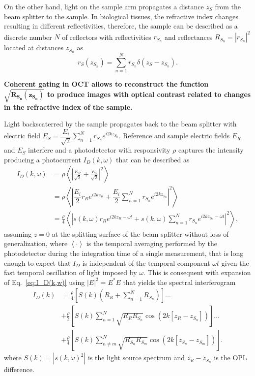 On the other hand, light on the sample arm propagates a distance $z_S$ from the beam splitter to the sample. In biological tissues, the refractive index changes resulting in different reflectivities, therefore, the sample can be described as a discrete number $N$ of reflectors with reflectivities $r_{S_n}$ and reflectances $R_{S_n}=|r_{S_n}|^2$ located at distances $z_{S_n}$ as
\begin{equation}
    r_S(z_{S_n}) = \sum_{n=1}^N r_{S_n}\delta\left(z_S-z_{S_n}\right).
\end{equation}

\textbf{Coherent gating in OCT allows to reconstruct the function $\mathbf{\sqrt{R_{S_n}(z_{S_n})}}$ to produce images with optical contrast related to changes in the refractive index of the sample.}~\cite{Izatt2015_Theory}

Light backscaterred by the sample propagates back to the beam splitter with electric field $E_S=\dfrac{E_i}{\sqrt{2}}\sum\limits_{n=1}^Nr_{S_n}e^{i2kz_{S_n}}$. Reference and sample electric fields $E_R$ and $E_S$ interfere and a photodetector with responsivity $\rho$ captures the intensity producing a photocurrent $I_D(k, \omega)$ that can be described as~\cite{Izatt2015_Theory}
\begin{align}\label{eq:I_D(k,w)}
    I_D(k, \omega) &= \rho\left<\left|\frac{E_R}{\sqrt{2}} + \frac{E_S}{\sqrt{2}}\right|^2\right> \nonumber\\
    & = \rho\left<\left|\dfrac{E_i}{2} r_R e^{i2kz_R} + \dfrac{E_i}{2}\sum\limits_{n=1}^Nr_{S_n}e^{i2kz_{S_n}}\right|^2\right> \\
    & = \frac{\rho}{4}\left<\left|s(k,\omega) r_R e^{i2kz_R-\omega t} + s(k,\omega)\sum\limits_{n=1}^Nr_{S_n}e^{i2kz_{S_n}-\omega t}\right|^2\right>, \nonumber
\end{align}
assuming $z=0$ at the splitting surface of the beam splitter without loss of generalization, where $\left<\cdot\right>$ is the temporal averaging performed by the photodetector during the integration time of a single measurement, that is long enough to expect that $I_D$ is independent of the temporal component $\omega t$ given the fast temporal oscillation of light imposed by $\omega$. This is consequent with expansion of Eq.~\eqref{eq:I_D(k,w)} using $|E|^2 = E^*E$ that yields the spectral interferogram~\cite{Izatt2015_Theory}
\begin{align}\label{eq:I_D(k)}
I_D(k) &= \frac{\rho}{4}\left[S(k)\left(R_R + \sum_{n=1}^N R_{S_n}\right)\right] ... \nonumber\\
&+ \frac{\rho}{2} \left[S(k)\sum_{n=1}^N\sqrt{R_RR_{S_n}}\cos\left(2k\left[z_R-z_{S_n}\right]\right)\right] ... \\
&+ \frac{\rho}{4}\left[S(k)\sum_{n\neq m}^N\sqrt{R_{S_n}R_{S_m}}\cos\left(2k\left[z_{S_n}-z_{S_m}\right]\right)\right]. \nonumber
\end{align}
where $S(k) = |s(k,\omega)^2|$ is the light source spectrum and $z_R-z_{S_n}$ is the OPL difference.


